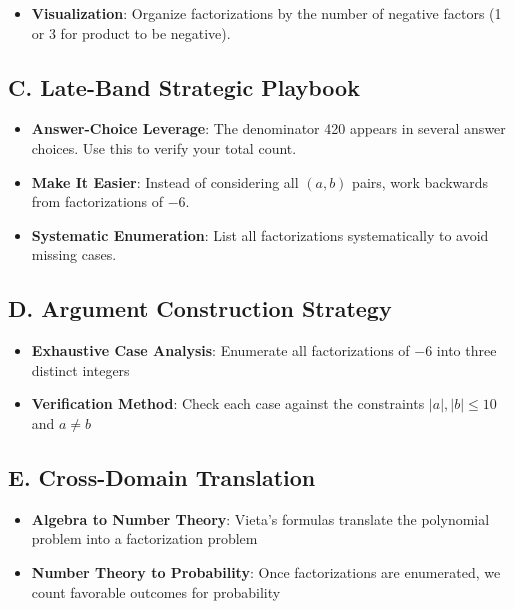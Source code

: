 \documentclass[12pt]{article}
\begin{document}
\begin{strategicbox}
\begin{itemize}[leftmargin=*]
    \item \textbf{Visualization}: Organize factorizations by the number of negative factors (1 or 3 for product to be negative).
\end{itemize}

\subsection*{C. Late-Band Strategic Playbook}
\begin{itemize}[leftmargin=*]
    \item \textbf{Answer-Choice Leverage}: The denominator 420 appears in several answer choices. Use this to verify your total count.
    
    \item \textbf{Make It Easier}: Instead of considering all $(a,b)$ pairs, work backwards from factorizations of $-6$.
    
    \item \textbf{Systematic Enumeration}: List all factorizations systematically to avoid missing cases.
\end{itemize}

\subsection*{D. Argument Construction Strategy}
\begin{itemize}[leftmargin=*]
    \item \textbf{Exhaustive Case Analysis}: Enumerate all factorizations of $-6$ into three distinct integers
    
    \item \textbf{Verification Method}: Check each case against the constraints $|a|, |b| \leq 10$ and $a \neq b$
\end{itemize}

\subsection*{E. Cross-Domain Translation}
\begin{itemize}[leftmargin=*]
    \item \textbf{Algebra to Number Theory}: Vieta's formulas translate the polynomial problem into a factorization problem
    
    \item \textbf{Number Theory to Probability}: Once factorizations are enumerated, we count favorable outcomes for probability
\end{itemize}
\end{strategicbox}
\end{document}
